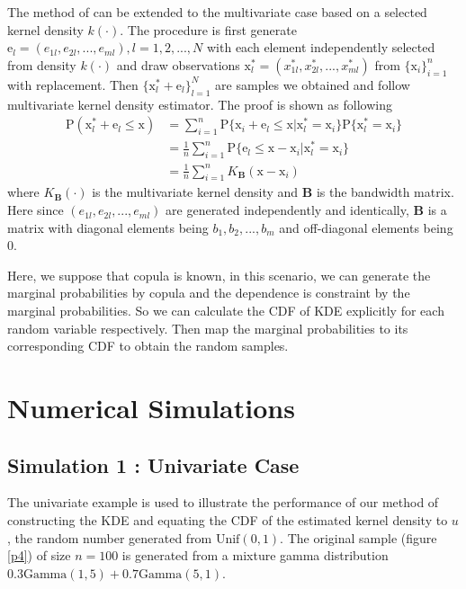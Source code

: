 \documentclass[letterpaper,12pt,hidelinks]{article}
\begin{document}
The method of \cite{kde} can be extended to the multivariate case based on a selected kernel density $k(\cdot)$. The procedure is first generate $\bm{\mathrm{e}}_l = (e_{1l}, e_{2l}, ..., e_{ml}), l = 1,2, ..., N$ with each element independently selected from density $k(\cdot)$ and draw observations $\bm{\mathrm{x}}_l^* = (x_{1l}^*, x_{2l}^*, ..., x_{ml}^*)$ from $\{\bm{\mathrm{x}}_i\}_{i=1}^n$ with replacement. Then $\{\bm{\mathrm{x}}_l^* + \bm{\mathrm{e}}_l\}_{l = 1}^N$ are samples we obtained and follow multivariate kernel density estimator. The proof is shown as following
\begin{align*}
\mathrm{P}(\bm{\mathrm{x}}_l^* + \bm{\mathrm{e}}_l \le \bm{\mathrm{x}}) &= \sum_{i=1}^n \mathrm{P}\{\bm{\mathrm{x}}_i + \bm{\mathrm{e}}_l \le \bm{\mathrm{x}} |  \bm{\mathrm{x}}_l^* = \bm{\mathrm{x}}_i\} \mathrm{P}\{ \bm{\mathrm{x}}_l^* = \bm{\mathrm{x}}_i\} \\
&= \frac{1}{n} \sum_{i=1}^n \mathrm{P}\{  \bm{\mathrm{e}}_l \le \bm{\mathrm{x}} - \bm{\mathrm{x}}_i |\bm{\mathrm{x}}_l^* = \bm{\mathrm{x}}_i\}\\
&= \frac{1}{n} \sum_{i=1}^n K_{\bm{B}}(\bm{\mathrm{x}} - \bm{\mathrm{x}}_i)
\end{align*}
where $K_{\bm{B}}(\cdot)$ is the multivariate kernel density and $\bm{B}$ is the bandwidth matrix. Here since $(e_{1l}, e_{2l}, ..., e_{ml})$ are generated independently and identically, $\bm{B}$ is a matrix with diagonal elements being $b_1, b_2, ..., b_m$ and off-diagonal elements being $0$.

Here, we suppose that copula is known, in this scenario, we can generate the marginal probabilities by copula and the dependence is constraint by the marginal probabilities. So we can calculate the CDF of KDE explicitly for each random variable respectively. Then map the marginal probabilities to its corresponding CDF to obtain the random samples.

\section{Numerical Simulations}
\subsection{Simulation 1 : Univariate Case}
The univariate example is used to illustrate the performance of our method of constructing the KDE and equating the CDF of the estimated kernel density to $u$, the random number generated from $\text{Unif}(0,1)$. The original sample (figure \ref{p4}) of size $n = 100$ is generated from a mixture gamma distribution $0.3\text{Gamma}(1, 5) + 0.7 \text{Gamma}(5,1)$.
\end{document}
